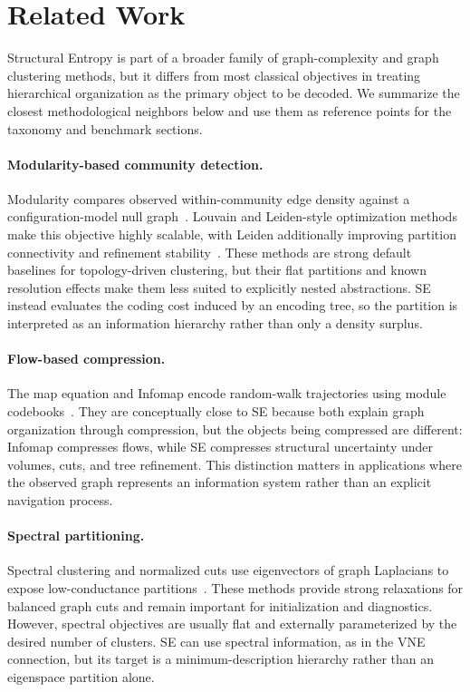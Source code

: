 \section{Related Work}
\label{sec:related}

Structural Entropy is part of a broader family of graph-complexity and graph
clustering methods, but it differs from most classical objectives in treating
hierarchical organization as the primary object to be decoded.
We summarize the closest methodological neighbors below and use them as
reference points for the taxonomy and benchmark sections.

\paragraph{Modularity-based community detection.}
Modularity compares observed within-community edge density against a
configuration-model null graph~\cite{newman2004findingmodularity}.
Louvain and Leiden-style optimization methods make this objective highly
scalable, with Leiden additionally improving partition connectivity and
refinement stability~\cite{traag2019leiden}.
These methods are strong default baselines for topology-driven clustering,
but their flat partitions and known resolution effects make them less suited
to explicitly nested abstractions.
SE instead evaluates the coding cost induced by an encoding tree, so the
partition is interpreted as an information hierarchy rather than only a
density surplus.

\paragraph{Flow-based compression.}
The map equation and Infomap encode random-walk trajectories using module
codebooks~\cite{rosvall2008maps}.
They are conceptually close to SE because both explain graph organization
through compression, but the objects being compressed are different:
Infomap compresses flows, while SE compresses structural uncertainty under
volumes, cuts, and tree refinement.
This distinction matters in applications where the observed graph represents
an information system rather than an explicit navigation process.

\paragraph{Spectral partitioning.}
Spectral clustering and normalized cuts use eigenvectors of graph Laplacians
to expose low-conductance partitions~\cite{shi2000normalized,ng2002spectral}.
These methods provide strong relaxations for balanced graph cuts and remain
important for initialization and diagnostics.
However, spectral objectives are usually flat and externally parameterized by
the desired number of clusters.
SE can use spectral information, as in the VNE connection, but its target is a
minimum-description hierarchy rather than an eigenspace partition alone.

